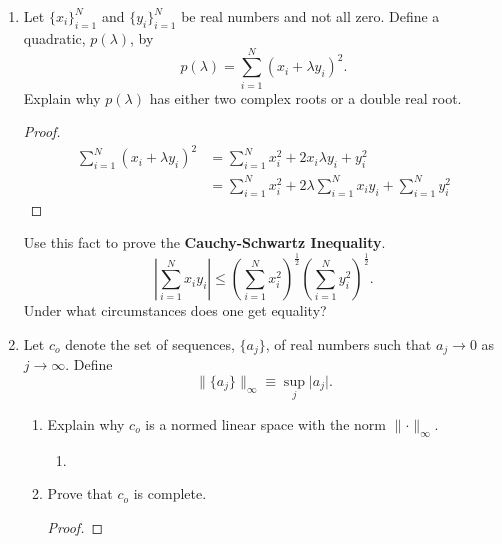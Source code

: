 \documentclass{article}
\begin{document}
\begin{enumerate}
\begin{enumerate}
\begin{proof}
\begin{align*}
                                    \\
                                    \therefore\lVert x\rVert_2 & \leq \lVert x\rVert_1\leq \lVert x\rVert_2
                              \end{align*}
                        \end{proof}
                  \item Prove that the sup norm and the $L_1$ norm are not
                        equivalent on $C[a,b]$.
                        \begin{proof}
                        \end{proof}
            \end{enumerate}
            \setcounter{enumi}{9}
      \item Let $\{x_i\}_{i=1}^N$ and $\{y_i\}_{i=1}^N$ be real numbers and not
            all zero. Define a quadratic, $p(\lambda)$, by
            \[
                  p(\lambda)=\sum_{i=1}^N(x_i+\lambda y_i)^2.
            \]
            Explain why $p(\lambda)$ has either two complex roots or a double
            real root.
            \begin{proof}
                  \begin{align*}
                        \sum_{i=1}^N(x_i+\lambda y_i)^2 & = \sum_{i=1}^Nx_i^2+2x_i\lambda y_i + y_i^2                          \\
                                                        & = \sum_{i=1}^Nx_i^2 + 2\lambda\sum_{i=1}^Nx_iy_i + \sum_{i=1}^Ny_i^2
                  \end{align*}
            \end{proof}
            Use this fact to prove the \textbf{Cauchy-Schwartz
                  Inequality}.
            \begin{equation}
                  \left\lvert\sum_{i=1}^Nx_iy_i\right\rvert \leq
                  \left(\sum_{i=1}^Nx_i^2\right)^\frac{1}{2}
                  \left(\sum_{i=1}^Ny_i^2\right)^\frac{1}{2}.
            \end{equation}
            Under what circumstances does one get equality?
      \item Let $c_o$ denote the set of sequences, $\{a_j\}$, of real numbers such
            that $a_j\to 0$ as $j\to \infty$. Define
            \[
                  \lVert\{a_j\}\rVert_\infty\equiv\sup_j\lvert a_j\rvert.
            \]
            \begin{enumerate}
                  \item Explain why $c_o$ is a normed linear space with the norm
                        $\lVert\cdot\rVert_\infty$.
                        \begin{enumerate}
                              \item
                        \end{enumerate}
                  \item Prove that $c_o$ is complete.
                        \begin{proof}


\end{proof}
\end{enumerate}
\end{enumerate}
\end{document}
